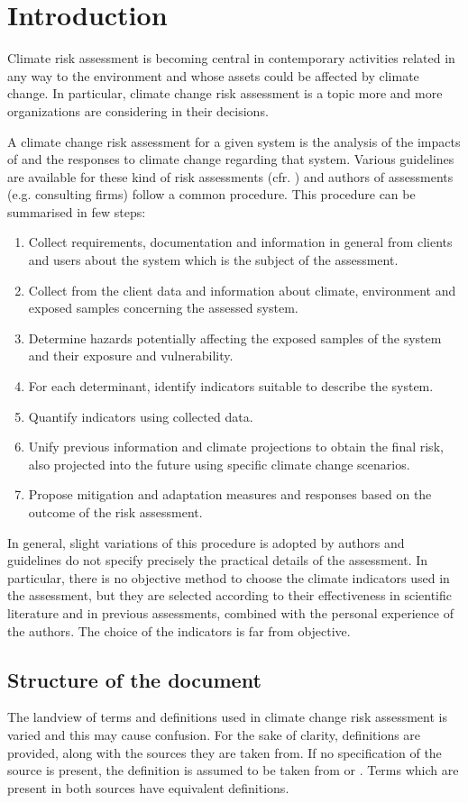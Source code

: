 \section{Introduction}
Climate risk assessment is becoming central in contemporary activities related in any way to the environment and whose assets could be affected by climate change.
In particular, climate change risk assessment is a topic more and more organizations are considering in their decisions.

A climate change risk assessment for a given system is the analysis of the impacts of and the responses to climate change regarding that system. Various guidelines are available for these kind of risk assessments (cfr. \cite{2021ISO14091,2024EEAExecutiveSummary,2017GIZTheVulnerability}) and authors of assessments (e.g. consulting firms) follow a common procedure.
This procedure can be summarised in few steps:
\begin{enumerate}
  \item Collect requirements, documentation and information in general from clients and users about the system which is the subject of the assessment.
  \item Collect from the client data and information about climate, environment and exposed samples concerning the assessed system.
  \item Determine hazards potentially affecting the exposed samples of the system and their exposure and vulnerability.
  \item For each determinant, identify indicators suitable to describe the system.
  \item Quantify indicators using collected data.
  \item Unify previous information and climate projections to obtain the final risk, also projected into the future using specific climate change scenarios.
  \item Propose mitigation and adaptation measures and responses based on the outcome of the risk assessment.
\end{enumerate}

In general, slight variations of this procedure is adopted by authors and guidelines do not specify precisely the practical details of the assessment. In particular, there is no objective method to choose the climate indicators used in the assessment, but they are selected according to their effectiveness in scientific literature and in previous assessments, combined with the personal experience of the authors. The choice of the indicators is far from objective.

\subsection{Structure of the document}

The landview of terms and definitions used in climate change risk assessment is varied and this may cause confusion. For the sake of clarity, definitions are provided, along with the sources they are taken from.
If no specification of the source is present, the definition is assumed to be taken from \cite{2021ISO14091} or \cite{2021MatthewsAnnexVII}. Terms which are present in both sources have equivalent definitions.

